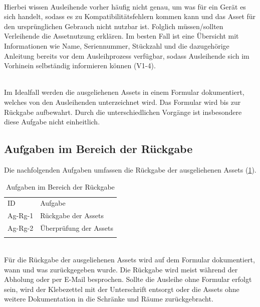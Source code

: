         {\sffamily\color{maincolor}{Ag-Au-2 | Erläuterung der Assetnutzung}}\\
Hierbei wissen Ausleihende vorher häufig nicht genau, um was für ein Gerät es
sich handelt, sodass es zu Kompatibilitätsfehlern kommen kann und das Asset für
den ursprünglichen Gebrauch nicht nutzbar ist. Folglich müssen/sollten
Verleihende die Assetnutzung erklären. Im besten Fall ist eine Übersicht mit
Informationen wie Name, Seriennummer, Stückzahl und die dazugehörige Anleitung
bereits vor dem Ausleihprozess verfügbar, sodass Ausleihende sich im Vorhinein
selbständig informieren können (V1-4).

        {\sffamily\color{maincolor}{Ag-Au-3 | Unterschreiben des Formulars}}\\
Im Idealfall werden die ausgeliehenen Assets in einem Formular dokumentiert,
welches von den Ausleihenden unterzeichnet wird. Das Formular wird bis zur
Rückgabe aufbewahrt. Durch die unterschiedlichen Vorgänge ist insbesondere diese
Aufgabe nicht einheitlich.

\subsection{Aufgaben im Bereich der Rückgabe}
Die nachfolgenden Aufgaben umfassen die Rückgabe der ausgeliehenen Assets
(\ref{table:Ag-Rg}).
\begin{table}[h]
        \centering
        \caption{Aufgaben im Bereich der Rückgabe}
        \begin{tabular}{ll}
                \arrayrulecolor{maincolor}\hline
                \sffamily\color{maincolor}ID & \sffamily\color{maincolor}Aufgabe
                \\
                \arrayrulecolor{maincolor}\hline
                Ag-Rg-1                      & Rückgabe der Assets
                \\
                Ag-Rg-2                      & Überprüfung der Assets
                \\
                \arrayrulecolor{maincolor}\hline
        \end{tabular}
        \label{table:Ag-Rg}
\end{table}

{\sffamily\color{maincolor}{Ag-Rg-1 | Rückgabe der Assets}} \\
Für die Rückgabe der ausgeliehenen Assets wird auf dem Formular dokumentiert,
wann und was zurückgegeben wurde. Die Rückgabe wird meist während der Abholung
oder per E-Mail besprochen. Sollte die Ausleihe ohne Formular erfolgt sein, wird
der Klebezettel mit der Unterschrift entsorgt oder die Assets ohne weitere
Dokumentation in die Schränke und Räume zurückgebracht.


